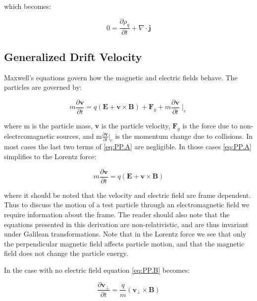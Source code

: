 \documentclass[utf8]{report}
\begin{document}
which becomes: 

\begin{equation}
    0 = \frac{\partial \rho_{q}}{\partial t} + \nabla \cdot \textbf{j}
    \label{eq:ConserveCharge}
\end{equation}

\subsection{Generalized Drift Velocity}
Maxwell's equations govern how the magnetic and electric fields behave. The particles are governed by: 

\begin{equation}
    m \frac{\partial \textbf{v}}{\partial t} = q ( \textbf{E} + \textbf{v} \times \textbf{B}) + \textbf{F}_{g} + m \frac{\partial \textbf{v}}{\partial t}\mid_{c}
    \label{eq:PP.A}
\end{equation}

where m is the particle mass, \textbf{v} is the particle velocity, $\textbf{F}_{g}$ is the force due to non-electrcomagnetic sources, and m$\frac{\partial \textbf{v}}{\partial t}|_{c}$ is the momentum change due to collisions. In most cases the last two terms of \ref{eq:PP.A} are negligible. In those cases \ref{eq:PP.A} simplifies to the Lorentz force: 

\begin{equation}
    m \frac{\partial \textbf{v}}{\partial t} = q ( \textbf{E} + \textbf{v} \times \textbf{B}) 
    \label{eq:PP.B}
\end{equation}

where it should be noted that the velocity and electric field are frame dependent. Thus to discuss the motion of a test particle through an electromagnetic field we require information about the frame. The reader should also note that the equations presented in this derivation are non-relativistic, and are thus invariant under Galilean transformations. Note that in the Lorentz force we see that only the perpendicular magnetic field affects particle motion, and that the magnetic field does not change the particle energy. 

In the case with no electric field equation \ref{eq:PP.B} becomes: 
    
\begin{equation}
    \frac{\partial \textbf{v}_{\perp}}{\partial t} = \frac{q}{m} (\textbf{v}_{\perp} \times \textbf{B}) 
    \label{eq:PP.C}
\end{equation}
\end{document}
